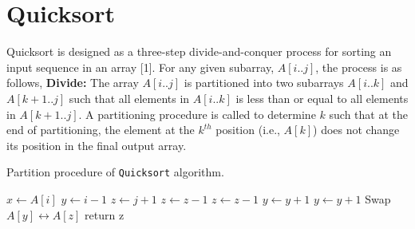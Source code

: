 \documentclass[a4paper, 10pt,twocolumn]{article} %
\begin{document}
\section{Quicksort}
Quicksort is designed as a three-step divide-and-conquer process for sorting an input sequence in an array [1]. For any given subarray, $A[i..j]$, the process is as follows,\newline
\textbf{Divide:} The array $A[i..j]$ is partitioned into two subarrays $A[i..k]$ and $A[k+1..j]$ such that all elements in $A[i..k]$ is less than or equal to all elements in $A[k+1..j]$. A partitioning procedure is called to determine $k$ such that at the end of partitioning, the element at the $k^{th}$ position (i.e., $A[k]$) does not change its position in the final output array.


\begin{algorithm}
\caption{Partition procedure of \texttt{Quicksort} algorithm.}
\begin{algorithmic}[1]
    \Statex{}
    \Statex{}
    \State $x \gets A[i]$
    \State $y \gets i - 1$ %
    \State $z \gets j + 1$
        \State $z \gets z - 1$
            \State $z \gets z - 1$
        \EndWhile
        \State $y \gets y + 1$
            \State $y \gets y + 1$
        \EndWhile
            \State Swap $A[y] \leftrightarrow A[z]$
        \Else
            \State return z
        \EndIf
    \EndWhile
\EndProcedure
\end{algorithmic}
\end{algorithm}
\end{document}
